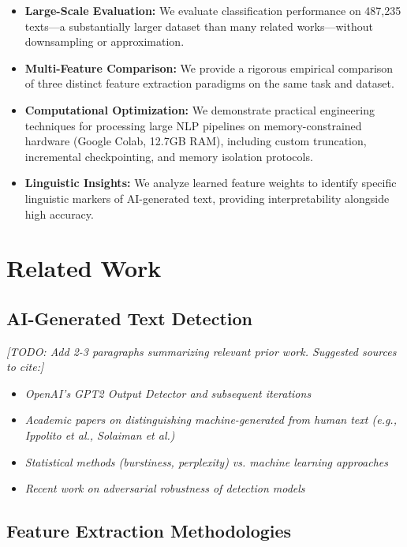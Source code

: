 \documentclass[12pt, a4paper]{article}
\begin{document}
\begin{itemize}
    \item \textbf{Large-Scale Evaluation:} We evaluate classification performance on 487,235 texts---a substantially larger dataset than many related works---without downsampling or approximation.
    \item \textbf{Multi-Feature Comparison:} We provide a rigorous empirical comparison of three distinct feature extraction paradigms on the same task and dataset.
    \item \textbf{Computational Optimization:} We demonstrate practical engineering techniques for processing large NLP pipelines on memory-constrained hardware (Google Colab, 12.7GB RAM), including custom truncation, incremental checkpointing, and memory isolation protocols.
    \item \textbf{Linguistic Insights:} We analyze learned feature weights to identify specific linguistic markers of AI-generated text, providing interpretability alongside high accuracy.
\end{itemize}

\section{Related Work}

\subsection{AI-Generated Text Detection}

\textit{[TODO: Add 2-3 paragraphs summarizing relevant prior work. Suggested sources to cite:]}
\begin{itemize}
    \item \textit{OpenAI's GPT2 Output Detector and subsequent iterations}
    \item \textit{Academic papers on distinguishing machine-generated from human text (e.g., Ippolito et al., Solaiman et al.)}
    \item \textit{Statistical methods (burstiness, perplexity) vs. machine learning approaches}
    \item \textit{Recent work on adversarial robustness of detection models}
\end{itemize}

\subsection{Feature Extraction Methodologies}
\end{document}
